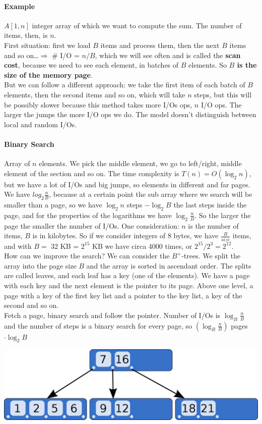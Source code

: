 \documentclass[10pt]{report}
\begin{document}
\paragraph{Example} $A[1, n]$ integer array of which we want to compute the sum. The number of items, then, is $n$.\\
First situation: first we load $B$ items and process them, then the next $B$ items and so on\ldots $\Rightarrow$ \# I/O = $n/B$, which we will see often and is called the \textbf{scan cost}, because we need to see each element, in batches of $B$ elements. So \textbf{$B$ is the size of the memory page}.\\
But we can follow a different approach: we take the first item of each batch of $B$ elements, then the second items and so on, which will take $n$ steps, but this will be possibly slower because this method takes more I/Os ops, $n$ I/O ops. The larger the jumps the more I/O ops we do. The model doesn't distinguish between local and random I/Os.
\paragraph{Binary Search} Array of $n$ elements. We pick the middle element, we go to left/right, middle element of the section and so on. The time complexity is $T(n) = O(\log_2 n)$, but we have a lot of I/Os and big jumps, so elements in different and far pages. We have $log_2 \frac{n}{B}$, because at a certain point the sub array where we search will be smaller than a page, so we have $\log_2 n$ steps $- \log_2 B$ the last steps inside the page, and for the properties of the logarithms we have $\log_2 \frac{n}{B}$. So the larger the page the smaller the number of I/Os. One consideration: $n$ is the number of items, $B$ is in kilobytes. So if we consider integers of 8 bytes, we have $\frac{B}{size}$ items, and with $B =$ 32 KB = $2^{15}$ KB we have circa 4000 times, or $2^{15}/2^3 = 2^{12}$.\\
How can we improve the search? We can consider the $B^+$-trees. We split the array into the page size $B$ and the array is sorted in ascendant order. The splits are called leaves, and each leaf has a key (one of the elements). We have a page with each key and the next element is the pointer to its page. Above one level, a page with a key of the first key list and a pointer to the key list, a key of the second and so on.\\ %
Fetch a page, binary search and follow the pointer. Number of I/Os is $\log_B \frac{n}{B}$ and the number of steps is a binary search for every page, so $(\log_B \frac{n}{B})$ pages $\cdot \log_2 B$
\begin{center}
	\includegraphics[scale=0.25]{2.png}
\end{center}
\end{document}
